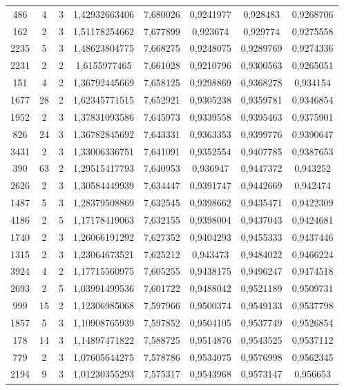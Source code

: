 \begin{longtable}{|c|c|c|c|c|c|c|c|}
486 & 4 & 3 & 1,42932663406 & 7,680026 & 0,9241977 & 0,928483 & 0,9268706 \\
162 & 2 & 3 & 1,51178254662 & 7,677899 & 0,923674 & 0,929774 & 0,9275558 \\
2235 & 5 & 3 & 1,48623804775 & 7,668275 & 0,9248075 & 0,9289769 & 0,9274336 \\
2231 & 2 & 2 & 1,6155977465 & 7,661028 & 0,9210796 & 0,9300563 & 0,9265051 \\
151 & 4 & 2 & 1,36792445669 & 7,658125 & 0,9298869 & 0,9368278 & 0,934154 \\
1677 & 28 & 2 & 1,62345771515 & 7,652921 & 0,9305238 & 0,9359781 & 0,9346854 \\
1952 & 2 & 3 & 1,37831093586 & 7,645973 & 0,9339558 & 0,9395463 & 0,9375901 \\
826 & 24 & 3 & 1,36782845692 & 7,643331 & 0,9363353 & 0,9399776 & 0,9390647 \\
3431 & 2 & 3 & 1,33006336751 & 7,641091 & 0,9352554 & 0,9407785 & 0,9387653 \\
390 & 63 & 2 & 1,29515417793 & 7,640953 & 0,936947 & 0,9447372 & 0,943252 \\
2626 & 2 & 3 & 1,30584449939 & 7,634447 & 0,9391747 & 0,9442669 & 0,942474 \\
1487 & 5 & 3 & 1,28379508869 & 7,632545 & 0,9398662 & 0,9435471 & 0,9422309 \\
4186 & 2 & 5 & 1,17178419063 & 7,632155 & 0,9398004 & 0,9437043 & 0,9424681 \\
1740 & 2 & 3 & 1,26066191292 & 7,627352 & 0,9404293 & 0,9455333 & 0,9437446 \\
1315 & 2 & 3 & 1,23064673521 & 7,625212 & 0,943473 & 0,9484022 & 0,9466224 \\
3924 & 4 & 2 & 1,17715560975 & 7,605255 & 0,9438175 & 0,9496247 & 0,9474518 \\
2693 & 2 & 5 & 1,03991499536 & 7,601722 & 0,9488042 & 0,9521189 & 0,9509731 \\
999 & 15 & 2 & 1,12306985068 & 7,597966 & 0,9500374 & 0,9549133 & 0,9537798 \\
1857 & 5 & 3 & 1,10908765939 & 7,597852 & 0,9504105 & 0,9537749 & 0,9526854 \\
178 & 14 & 3 & 1,14897471822 & 7,588725 & 0,9514876 & 0,9543525 & 0,9537112 \\
779 & 2 & 3 & 1,07605644275 & 7,578786 & 0,9534075 & 0,9576998 & 0,9562345 \\
2194 & 9 & 3 & 1,01230355293 & 7,575317 & 0,9543968 & 0,9573147 & 0,956653 \\

\end{longtable}
